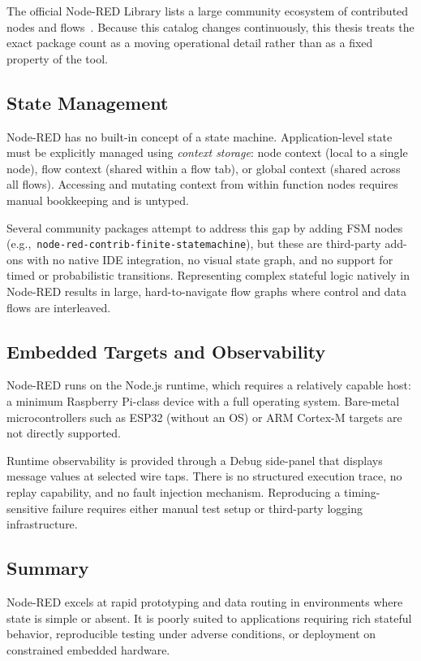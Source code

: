 The official Node-RED Library lists a large community ecosystem of contributed nodes and flows~\cite{NodeREDLibrary}. Because this catalog changes continuously, this thesis treats the exact package count as a moving operational detail rather than as a fixed property of the tool.

\subsection{State Management}

Node-RED has no built-in concept of a state machine. Application-level state must be explicitly managed using \textit{context storage}: node context (local to a single node), flow context (shared within a flow tab), or global context (shared across all flows). Accessing and mutating context from within function nodes requires manual bookkeeping and is untyped.

Several community packages attempt to address this gap by adding FSM nodes (e.g.,\ \texttt{node-red-contrib-\allowbreak{}finite-statemachine}), but these are third-party add-ons with no native IDE integration, no visual state graph, and no support for timed or probabilistic transitions. Representing complex stateful logic natively in Node-RED results in large, hard-to-navigate flow graphs where control and data flows are interleaved.

\subsection{Embedded Targets and Observability}

Node-RED runs on the Node.js runtime, which requires a relatively capable host: a minimum Raspberry Pi-class device with a full operating system. Bare-metal microcontrollers such as ESP32 (without an OS) or ARM Cortex-M targets are not directly supported.

Runtime observability is provided through a Debug side-panel that displays message values at selected wire taps. There is no structured execution trace, no replay capability, and no fault injection mechanism. Reproducing a timing-sensitive failure requires either manual test setup or third-party logging infrastructure.

\subsection{Summary}

Node-RED excels at rapid prototyping and data routing in environments where state is simple or absent. It is poorly suited to applications requiring rich stateful behavior, reproducible testing under adverse conditions, or deployment on constrained embedded hardware.

